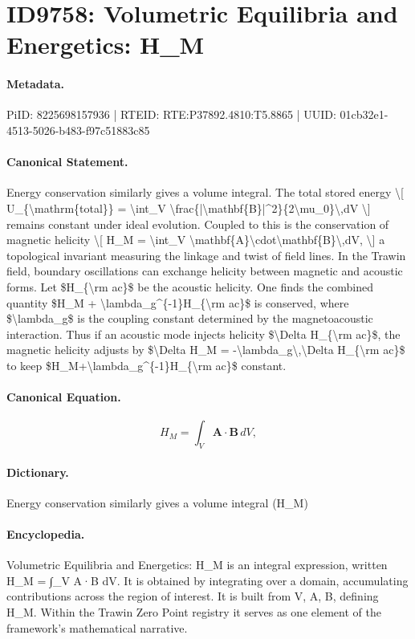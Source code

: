 \section*{ID9758: Volumetric Equilibria and Energetics: H\_M}
\paragraph{Metadata.}
PiID: 8225698157936 | RTEID: RTE:P37892.4810:T5.8865 | UUID: 01cb32e1-4513-5026-b483-f97c51883c85

\paragraph{Canonical Statement.}
Energy conservation similarly gives a volume integral. The total stored energy \textbackslash{}[ U\_\{\textbackslash{}mathrm\{total\}\} = \textbackslash{}int\_V \textbackslash{}frac\{|\textbackslash{}mathbf\{B\}|\textasciicircum{}2\}\{2\textbackslash{}mu\_0\}\textbackslash{},dV \textbackslash{}] remains constant under ideal evolution. Coupled to this is the conservation of magnetic helicity \textbackslash{}[ H\_M = \textbackslash{}int\_V \textbackslash{}mathbf\{A\}\textbackslash{}cdot\textbackslash{}mathbf\{B\}\textbackslash{},dV, \textbackslash{}] a topological invariant measuring the linkage and twist of field lines. In the Trawin field, boundary oscillations can exchange helicity between magnetic and acoustic forms. Let \$H\_\{\textbackslash{}rm ac\}\$ be the acoustic helicity. One finds the combined quantity \$H\_M + \textbackslash{}lambda\_g\textasciicircum{}\{-1\}H\_\{\textbackslash{}rm ac\}\$ is conserved, where \$\textbackslash{}lambda\_g\$ is the coupling constant determined by the magnetoacoustic interaction. Thus if an acoustic mode injects helicity \$\textbackslash{}Delta H\_\{\textbackslash{}rm ac\}\$, the magnetic helicity adjusts by \$\textbackslash{}Delta H\_M = -\textbackslash{}lambda\_g\textbackslash{},\textbackslash{}Delta H\_\{\textbackslash{}rm ac\}\$ to keep \$H\_M+\textbackslash{}lambda\_g\textasciicircum{}\{-1\}H\_\{\textbackslash{}rm ac\}\$ constant.

\paragraph{Canonical Equation.}
\[
H_M = \int_V \mathbf{A}\cdot\mathbf{B}\,dV,
\]

\paragraph{Dictionary.}
Energy conservation similarly gives a volume integral (H\_M)

\paragraph{Encyclopedia.}
Volumetric Equilibria and Energetics: H\_M is an integral expression, written H\_M = ∫\_V A·B dV. It is obtained by integrating over a domain, accumulating contributions across the region of interest. It is built from V, A, B, defining H\_M. Within the Trawin Zero Point registry it serves as one element of the framework's mathematical narrative.
